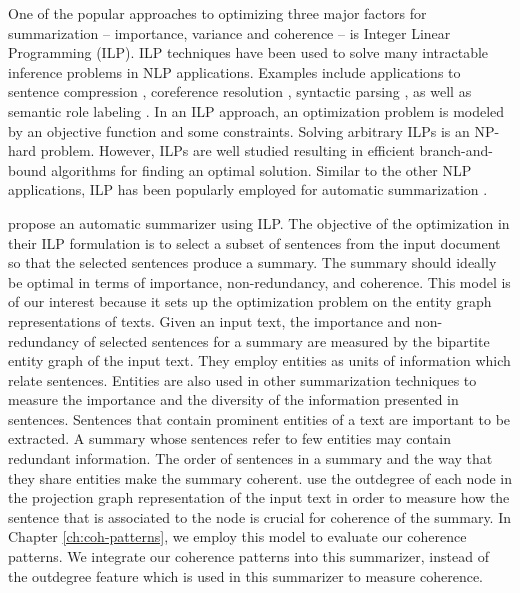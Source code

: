 One of the popular approaches to optimizing three major factors for summarization -- importance, variance and coherence -- is Integer Linear Programming (ILP). 
ILP techniques have been used to solve many intractable inference problems in NLP applications. 
Examples include applications to sentence compression \cite{clarke10,filippova13}, coreference resolution \cite{denis09},  syntactic parsing \cite{klenner07a}, as well as semantic role labeling \cite{punyakanok04b}.
In an ILP approach, an optimization problem is modeled by an objective function and some constraints. 
Solving arbitrary ILPs is an \mbox{NP-hard} problem. 
However, ILPs are well studied resulting in efficient \mbox{branch-and-bound} algorithms for finding an optimal solution. 
Similar to the other NLP applications, ILP has been popularly employed for automatic summarization 
\cite{nishikawa10,galanis12,marciniak05b,mcdonald07,bergkirkpatrick11,woodsend12,lichen13a,hirao13}.  

 propose an automatic summarizer using ILP.  
The objective of the optimization in their ILP formulation is to select a subset of sentences from the input document so that the selected sentences produce a summary.
The summary should ideally be optimal in terms of importance, non-redundancy, and coherence. 
This model is of our interest because it sets up the optimization problem on the entity graph representations of texts. 
Given an input text, the importance and non-redundancy of selected sentences for a summary are measured by the bipartite entity graph of the input text. 
They employ entities as units of information which relate sentences. 
Entities are also used in other summarization techniques to measure the importance and the diversity of the information presented in sentences.   
Sentences that contain prominent entities of a text are important to be extracted. 
A summary whose sentences refer to few entities may contain redundant information. 
The order of sentences in a summary and the way that they share entities make the summary coherent. 
 use the outdegree of each node in the projection graph representation of the input text in order to measure how the sentence that is associated to the node is crucial for coherence of the summary.  
In Chapter \ref{ch:coh-patterns}, we employ this model to evaluate our coherence patterns.
We integrate our coherence patterns into this summarizer, instead of the outdegree feature which is used in this summarizer to measure coherence. 
 

